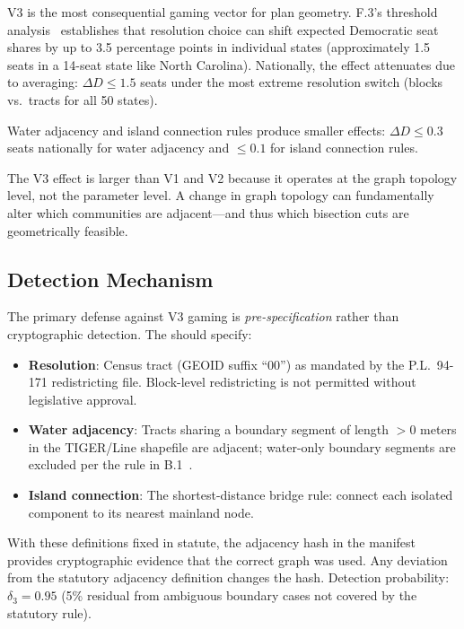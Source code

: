 V3 is the most consequential gaming vector for plan geometry.
F.3's threshold analysis~\citep{f3paper} establishes that resolution choice
can shift expected Democratic seat shares by up to 3.5 percentage points in
individual states (approximately 1.5 seats in a 14-seat state like North Carolina).
Nationally, the effect attenuates due to averaging: $\Delta D \leq 1.5$ seats
under the most extreme resolution switch (blocks vs.\ tracts for all 50 states).

Water adjacency and island connection rules produce smaller effects:
$\Delta D \leq 0.3$ seats nationally for water adjacency and $\leq 0.1$
for island connection rules.

The V3 effect is larger than V1 and V2 because it operates at the graph
topology level, not the parameter level.
A change in graph topology can fundamentally alter which communities are
adjacent---and thus which bisection cuts are geometrically feasible.

\subsection{Detection Mechanism}

The primary defense against V3 gaming is \emph{pre-specification} rather than
cryptographic detection.
The \dia{} should specify:
\begin{itemize}
\item \textbf{Resolution}: Census tract (GEOID suffix ``00'') as mandated
  by the P.L.\ 94-171 redistricting file.
  Block-level redistricting is not permitted without legislative approval.
\item \textbf{Water adjacency}: Tracts sharing a boundary segment of length
  $> 0$ meters in the TIGER/Line shapefile are adjacent; water-only boundary
  segments are excluded per the rule in B.1~\citep{b1paper}.
\item \textbf{Island connection}: The shortest-distance bridge rule:
  connect each isolated component to its nearest mainland node.
\end{itemize}

With these definitions fixed in statute, the adjacency hash in the manifest
provides cryptographic evidence that the correct graph was used.
Any deviation from the statutory adjacency definition changes the hash.
Detection probability: $\delta_3 = 0.95$ (5\% residual from ambiguous
boundary cases not covered by the statutory rule).
